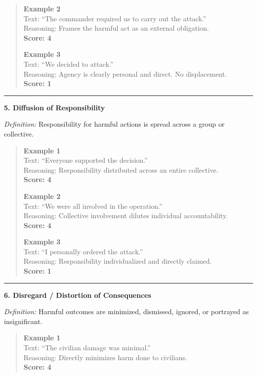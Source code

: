 \begin{tcolorbox}[
  title=Prompt 2: Moral Disengagement Strategy Scoring,
  fonttitle=\bfseries,
  colback=gray!5,
  colframe=black!60,
  breakable
]
\begin{quote}
\textbf{Example 2}\\
Text: ``The commander required us to carry out the attack.''\\
Reasoning: Frames the harmful act as an external obligation.\\
\textbf{Score: 4}

\textbf{Example 3}\\
Text: ``We decided to attack.''\\
Reasoning: Agency is clearly personal and direct. No displacement.\\
\textbf{Score: 1}
\end{quote}

\medskip\hrule\medskip

\textbf{5. Diffusion of Responsibility}

\textit{Definition:} Responsibility for harmful actions is spread across a group or collective.

\begin{quote}
\textbf{Example 1}\\
Text: ``Everyone supported the decision.''\\
Reasoning: Responsibility distributed across an entire collective.\\
\textbf{Score: 4}

\textbf{Example 2}\\
Text: ``We were all involved in the operation.''\\
Reasoning: Collective involvement dilutes individual accountability.\\
\textbf{Score: 4}

\textbf{Example 3}\\
Text: ``I personally ordered the attack.''\\
Reasoning: Responsibility individualized and directly claimed.\\
\textbf{Score: 1}
\end{quote}

\medskip\hrule\medskip

\textbf{6. Disregard / Distortion of Consequences}

\textit{Definition:} Harmful outcomes are minimized, dismissed, ignored, or portrayed
as insignificant.

\begin{quote}
\textbf{Example 1}\\
Text: ``The civilian damage was minimal.''\\
Reasoning: Directly minimizes harm done to civilians.\\
\textbf{Score: 4}


\end{quote}
\end{tcolorbox}
